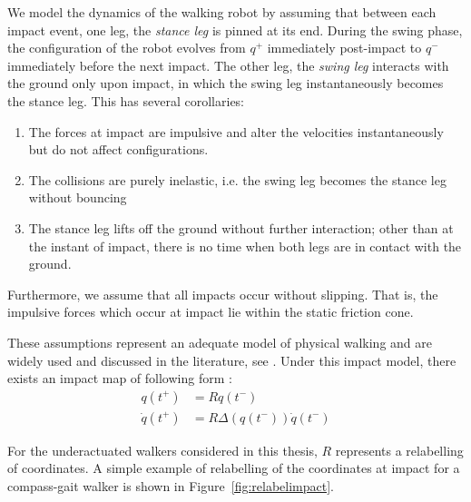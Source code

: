 We model the dynamics of the walking robot by assuming that between each impact event, one leg, the \textit{stance leg} is pinned at its end. During the swing phase, the configuration of the robot evolves from $q^+$ immediately post-impact to $q^-$ immediately before the next impact. The other leg, the \textit{swing leg} interacts with the ground only upon impact, in which the swing leg instantaneously becomes the stance leg. This has several corollaries:
\begin{enumerate}[parsep=0cm]
	\item The forces at impact are impulsive and alter the velocities instantaneously but do not affect configurations.
	\item The collisions are purely inelastic, i.e. the swing leg becomes the stance leg without bouncing
	\item The stance leg lifts off the ground without further interaction; other than at the instant of impact, there is no time when both legs are in contact with the ground.
\end{enumerate}
Furthermore, we assume that all impacts occur without slipping. That is, the impulsive forces which occur at impact lie within the static friction cone. 

These assumptions represent an adequate model of physical walking and are widely used and discussed in the literature, see \cite{hurmuzlu1994rigid, westervelt2007feedback}. Under this impact model, there exists an impact map of following form \cite{manchester2013planning}:
\begin{subequations}
\begin{align}
	q\left(t^+\right) &= Rq\left(t^-\right) \label{eqn:impactconfig}\\
	\dot{q}\left(t^+\right) &= R\Delta\left(q\left(t^-\right)\right)\dot{q}\left(t^-\right) \label{eqn:impactvel}
\end{align}
\end{subequations}

For the underactuated walkers considered in this thesis, $R$ represents a relabelling of coordinates. A simple example of relabelling of the coordinates at impact for a compass-gait walker is shown in Figure~\ref{fig:relabelimpact}.

